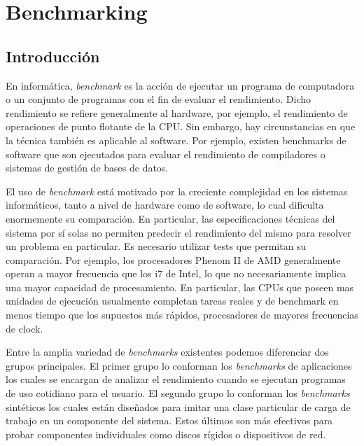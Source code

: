 \chapter{Benchmarking}

\section{Introducción}

En informática, \textit{benchmark} es la acción de ejecutar un
programa de computadora o un conjunto de programas con el fin de
evaluar el rendimiento. Dicho rendimiento se refiere generalmente al
hardware, por ejemplo, el rendimiento de operaciones de punto flotante
de la CPU. Sin embargo, hay circunstancias en que la técnica también
es aplicable al software. Por ejemplo, existen benchmarks de software
que son ejecutados para evaluar el rendimiento de compiladores o
sistemas de gestión de bases de datos.

El uso de \textit{benchmark} está motivado por la creciente
complejidad en los sistemas informáticos, tanto a nivel de hardware
como de software, lo cual dificulta enormemente su comparación. En
particular, las especificaciones técnicas del sistema por sí solas no
permiten predecir el rendimiento del mismo para resolver un problema
en particular. Es necesario utilizar tests que permitan su
comparación. Por ejemplo, los procesadores Phenom II de AMD
generalmente operan a mayor frecuencia que los i7 de Intel, lo
que no necesariamente implica una mayor capacidad de procesamiento. En
particular, las CPUs que poseen mas unidades de ejecución usualmente
completan tareas reales y de benchmark en menos tiempo que los
supuestos más rápidos, procesadores de mayores frecuencias de clock.

Entre la amplia variedad de \textit{benchmarks} existentes podemos
diferenciar dos grupos principales. El primer grupo lo conforman los
\textit{benchmarks} de aplicaciones los cuales se encargan de analizar
el rendimiento cuando se ejecutan programas de uso cotidiano para el
usuario. El segundo grupo lo conforman los \textit{benchmarks}
sintéticos los cuales están diseñados para imitar una clase particular
de carga de trabajo en un componente del sistema. Estos últimos son
más efectivos para probar componentes individuales como discos rígidos
o dispositivos de red.
	
